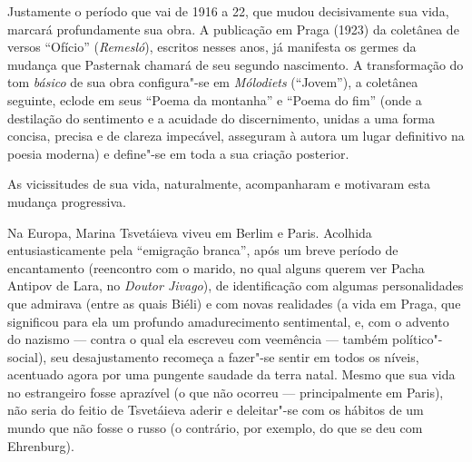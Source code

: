 Justamente o período que vai de 1916 a 22, que mudou decisivamente sua
vida, marcará profundamente sua obra. A publicação em Praga (1923) da
coletânea de versos ``Ofício'' (\emph{Remesló}), escritos nesses anos, já
manifesta os germes da mudança que Pasternak chamará de seu segundo
nascimento. A transformação do tom \emph{básico} de sua obra
configura"-se em \emph{Mólodiets}
(``Jovem''), a coletânea seguinte, eclode em seus ``Poema da montanha''
e ``Poema do fim'' (onde a destilação do sentimento e a acuidade do
discernimento, unidas a uma forma concisa, precisa e de clareza
impecável, asseguram à autora um lugar definitivo na poesia moderna) e
define"-se em toda a sua criação posterior.

As vicissitudes de sua vida, naturalmente, acompanharam e motivaram esta
mudança progressiva.

Na Europa, Marina Tsvetáieva viveu em Berlim e Paris. Acolhida
entusiasticamente pela ``emigração branca'', após um breve período de
encantamento (reencontro com o marido, no qual alguns querem ver Pacha
Antipov de Lara, no \emph{Doutor Jivago}), de identificação com algumas
personalidades que admirava (entre as quais Biéli) e com novas
realidades (a vida em Praga, que significou para ela um profundo
amadurecimento sentimental, e, com o advento do nazismo --- contra o qual
ela escreveu com veemência --- também político"-social), seu
desajustamento recomeça a fazer"-se sentir em todos os níveis, acentuado
agora por uma pungente saudade da terra natal. Mesmo que sua vida no
estrangeiro fosse aprazível (o que não ocorreu --- principalmente em
Paris), não seria do feitio de Tsvetáieva aderir e deleitar"-se com os
hábitos de um mundo que não fosse o russo (o contrário, por exemplo, do
que se deu com Ehrenburg).

